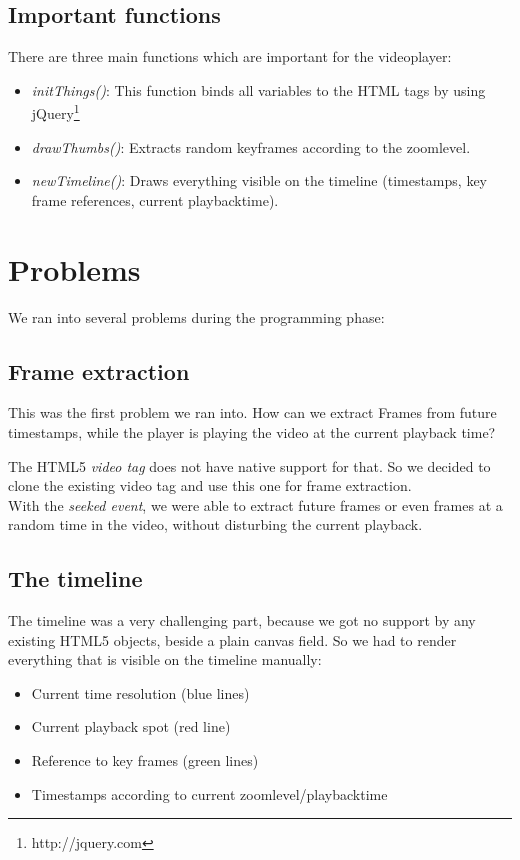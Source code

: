 \documentclass[11pt]{scrartcl}
\begin{document}
\subsection{Important functions}
There are three main functions which are important for the videoplayer:
\begin{itemize}
\item \emph{initThings()}: This function binds all variables to the HTML tags by using jQuery\footnote{http://jquery.com}
\item \emph{drawThumbs()}: Extracts random keyframes according to the zoomlevel.
\item \emph{newTimeline()}: Draws everything visible on the timeline (timestamps, key frame references, current playbacktime).
\end{itemize}

\section{Problems}

We ran into several problems during the programming phase: 

\subsection{Frame extraction}
This was the first problem we ran into. How can we extract Frames from future timestamps, while the player is playing the video at the current playback time? 

The HTML5 \emph{video tag} does not have native support for that. So we decided to clone the existing video tag and use this one for frame extraction. 
\\
With the \emph{seeked event}, we were able to extract future frames or even frames at a random time in the video, without disturbing the current playback.

\subsection{The timeline}
The timeline was a very challenging part, because we got no support by any existing HTML5 objects, beside a plain canvas field. So we had to render everything that is visible on the timeline manually:

\begin{itemize}
	\item Current time resolution (blue lines)
	\item Current playback spot (red line)
	\item Reference to key frames (green lines)
	\item Timestamps according to current zoomlevel/playbacktime
\end{itemize}
\end{document}
